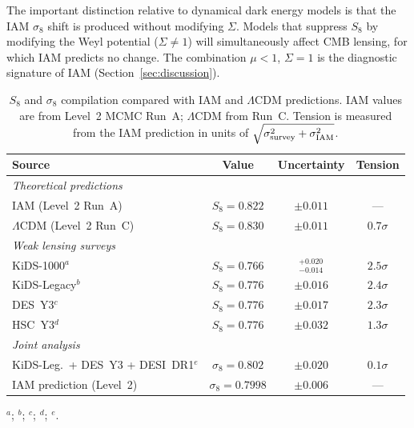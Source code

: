 \documentclass[12pt,a4paper]{article}
\newcommand{\lcdm}{$\Lambda$CDM}
\begin{document}
The important distinction relative to dynamical dark energy models is that
the IAM $\sigma_8$ shift is produced without modifying $\Sigma$.
Models that suppress $S_8$ by modifying the Weyl potential ($\Sigma \neq 1$)
will simultaneously affect CMB lensing, for which IAM predicts no change.
The combination $\mu < 1$, $\Sigma = 1$ is the diagnostic signature of
IAM (Section~\ref{sec:discussion}).

\begin{table}[ht]
\centering
\caption{$S_8$ and $\sigma_8$ compilation compared with IAM and \lcdm{}
predictions.
IAM values are from Level~2 MCMC Run~A; \lcdm{} from Run~C.
Tension is measured from the IAM prediction in units of
$\sqrt{\sigma_{\rm survey}^2 + \sigma_{\rm IAM}^2}$.}
\label{tab:s8}
\setlength{\tabcolsep}{6pt}
\begin{tabular}{p{4.8cm}ccc}
\toprule
Source & Value & Uncertainty & Tension \\
\midrule
\multicolumn{4}{l}{\textit{Theoretical predictions}} \\
IAM (Level~2 Run~A)      & $S_8 = 0.822$ & $\pm 0.011$ & --- \\
\lcdm{} (Level~2 Run~C)  & $S_8 = 0.830$ & $\pm 0.011$ & $0.7\sigma$ \\
\midrule
\multicolumn{4}{l}{\textit{Weak lensing surveys}} \\
KiDS-1000$^a$            & $S_8 = 0.766$ & $^{+0.020}_{-0.014}$ & $2.5\sigma$ \\
KiDS-Legacy$^b$          & $S_8 = 0.776$ & $\pm 0.016$ & $2.4\sigma$ \\
DES~Y3$^c$               & $S_8 = 0.776$ & $\pm 0.017$ & $2.3\sigma$ \\
HSC~Y3$^d$               & $S_8 = 0.776$ & $\pm 0.032$ & $1.3\sigma$ \\
\midrule
\multicolumn{4}{l}{\textit{Joint analysis}} \\
KiDS-Leg.\ + DES~Y3 + DESI~DR1$^e$ & $\sigma_8 = 0.802$ & $\pm 0.020$ & $0.1\sigma$ \\
IAM prediction (Level~2) & $\sigma_8 = 0.7998$ & $\pm 0.006$ & --- \\
\bottomrule
\end{tabular}
\par\smallskip
\raggedright\small
$^a$\citet{Asgari2021kids};\quad
$^b$\citet{Wright2025kids};\quad
$^c$\citet{Abbott2022desy3};\quad
$^d$\citet{Li2023hsc};\quad
$^e$\citet{Stolzner2025kids}.
\end{table}


\end{document}
